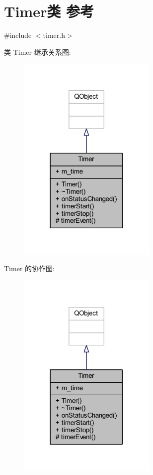 \hypertarget{class_timer}{}\section{Timer类 参考}
\label{class_timer}


{\ttfamily \#include $<$timer.\+h$>$}



类 Timer 继承关系图\+:
\nopagebreak
\begin{figure}[H]
\begin{center}
\leavevmode
\includegraphics[width=189pt]{class_timer__inherit__graph}
\end{center}
\end{figure}


Timer 的协作图\+:
\nopagebreak
\begin{figure}[H]
\begin{center}
\leavevmode
\includegraphics[width=189pt]{class_timer__coll__graph}
\end{center}
\end{figure}
